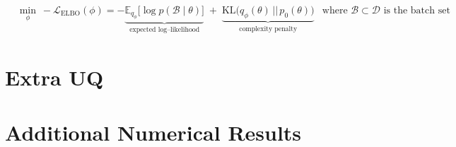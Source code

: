 \documentclass[preprint,12pt]{elsarticle}
\begin{document}
\begin{align}
  &\min_{\phi}\ - \mathcal L_{\mathrm{ELBO}}(\phi) 
  = -
     \underbrace{\mathbb E_{q_{\phi}}
       \!\bigl[\log p(\mathcal B\mid\theta)\bigr]}_{\text{expected log–likelihood}}
     \;+\;
     \underbrace{\mathrm{KL}\!\bigl(q_{\phi}(\theta)\,||\,p_{0}(\theta)\bigr)}_{\text{complexity penalty}}
    &\text{where }
    \mathcal B \subset \mathcal D
    \text{ is the batch set}
  \label{eq:minibatch_elbo}
\end{align}

\section{Extra UQ}
\label{sec:apd:uq}

\section{Additional Numerical Results}
\label{sec:apd:numerics}

 






\end{document}
